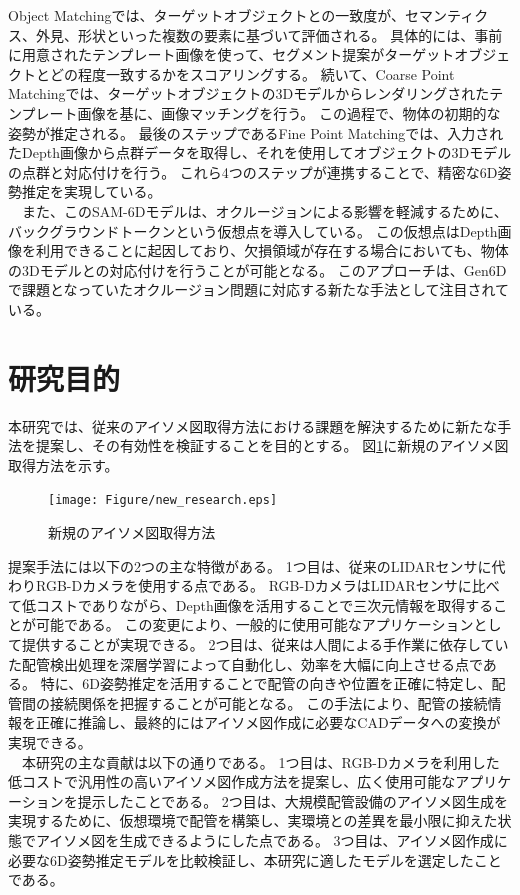 Object Matchingでは、ターゲットオブジェクトとの一致度が、セマンティクス、外見、形状といった複数の要素に基づいて評価される。
具体的には、事前に用意されたテンプレート画像を使って、セグメント提案がターゲットオブジェクトとどの程度一致するかをスコアリングする。
続いて、Coarse Point Matchingでは、ターゲットオブジェクトの3Dモデルからレンダリングされたテンプレート画像を基に、画像マッチングを行う。
この過程で、物体の初期的な姿勢が推定される。
最後のステップであるFine Point Matchingでは、入力されたDepth画像から点群データを取得し、それを使用してオブジェクトの3Dモデルの点群と対応付けを行う。
これら4つのステップが連携することで、精密な6D姿勢推定を実現している。\\
　また、このSAM-6Dモデルは、オクルージョンによる影響を軽減するために、バックグラウンドトークンという仮想点を導入している。
この仮想点はDepth画像を利用できることに起因しており、欠損領域が存在する場合においても、物体の3Dモデルとの対応付けを行うことが可能となる。
このアプローチは、Gen6Dで課題となっていたオクルージョン問題に対応する新たな手法として注目されている。


\section{研究目的}
本研究では、従来のアイソメ図取得方法における課題を解決するために新たな手法を提案し、その有効性を検証することを目的とする。
図\ref{fig:f3}に新規のアイソメ図取得方法を示す。\\
\begin{figure}[htbt]
	\centering
	 \texttt{[image: Figure/new\_research.eps]}
	 \caption{新規のアイソメ図取得方法}
	 \label{fig:f3}
\end{figure}

提案手法には以下の2つの主な特徴がある。
1つ目は、従来のLIDARセンサに代わりRGB-Dカメラを使用する点である。
RGB-DカメラはLIDARセンサに比べて低コストでありながら、Depth画像を活用することで三次元情報を取得することが可能である。
この変更により、一般的に使用可能なアプリケーションとして提供することが実現できる。
2つ目は、従来は人間による手作業に依存していた配管検出処理を深層学習によって自動化し、効率を大幅に向上させる点である。
特に、6D姿勢推定を活用することで配管の向きや位置を正確に特定し、配管間の接続関係を把握することが可能となる。
この手法により、配管の接続情報を正確に推論し、最終的にはアイソメ図作成に必要なCADデータへの変換が実現できる。\\
　本研究の主な貢献は以下の通りである。
1つ目は、RGB-Dカメラを利用した低コストで汎用性の高いアイソメ図作成方法を提案し、広く使用可能なアプリケーションを提示したことである。
2つ目は、大規模配管設備のアイソメ図生成を実現するために、仮想環境で配管を構築し、実環境との差異を最小限に抑えた状態でアイソメ図を生成できるようにした点である。
3つ目は、アイソメ図作成に必要な6D姿勢推定モデルを比較検証し、本研究に適したモデルを選定したことである。


